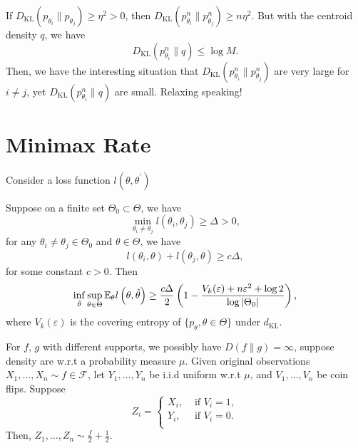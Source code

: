 If $D_{\text{KL}}\left(p_{\theta_{i}}\|p_{\theta_{j}}\right)\geq\eta^{2}>0$, then $D_{\text{KL}}\left(p_{\theta_{i}}^{n}\|p_{\theta_{j}}^{n}\right)\geq n\eta^{2}$. But with the centroid density $q$, we have
\begin{equation*}
	D_{\text{KL}}\left(p_{\theta_{i}}^{n}\|q\right)\leq\log M.
\end{equation*}
Then, we have the interesting situation that $D_{\text{KL}}\left(p_{\theta_{i}}^{n}\|p_{\theta_{j}}^{n}\right)$ are very large for $i\neq j$, yet $D_{\text{KL}}\left(p_{\theta_{i}}^{n}\|q\right)$ are small. Relaxing speaking!

\section{Minimax Rate}

Consider a loss function $l(\theta,\theta^{\prime})$

\begin{theorem}
	Suppose on a finite set $\Theta_{0}\subset\Theta$, we have
	\begin{equation}
		\min_{\theta_{i}\neq\theta_{j}}l(\theta_{i},\theta_{j})\geq\Delta>0,
	\end{equation}
	for any $\theta_{i}\neq\theta_{j}\in\Theta_{0}$ and $\theta\in\Theta$, we have
	\begin{equation}
		l(\theta_{i},\theta)+l(\theta_{j},\theta)\geq c\Delta,
	\end{equation}
	for some constant $c>0$. Then
	\begin{equation}
		\inf_{\hat{\theta}}\sup_{\theta\in\Theta}{\mathbb E}_{\theta}l\left(\theta,\hat{\theta}\right)\geq\frac{c\Delta}{2}\left(1-\frac{V_{k}(\varepsilon)+n\varepsilon^{2}+\log 2}{\log|\Theta_{0}|}\right),
	\end{equation}
	where $V_{k}(\varepsilon)$ is the covering entropy of $\{p_{\theta},\theta\in\Theta\}$ under $d_{\text{KL}}$.
\end{theorem}

For $f$, $g$ with different supports, we possibly have $D(f\|g)=\infty$, suppose density are w.r.t a probability measure $\mu$. Given original observations $X_{1},\ldots,X_{n}\sim f\in\mathcal{F}$, let $Y_{1},\ldots,Y_{n}$ be i.i.d uniform w.r.t $\mu$, and $V_{1},\ldots,V_{n}$ be coin flips. Suppose
\begin{equation*}
	Z_{i}=\left\{\begin{array}{ll}
		X_{i}, & \text{ if }V_{i}=1, \\
		Y_{i}, & \text{ if }V_{i}=0. \\
	\end{array}\right.
\end{equation*}
Then, $Z_{1},\ldots,Z_{n}\sim\frac{f}{2}+\frac{1}{2}$.

